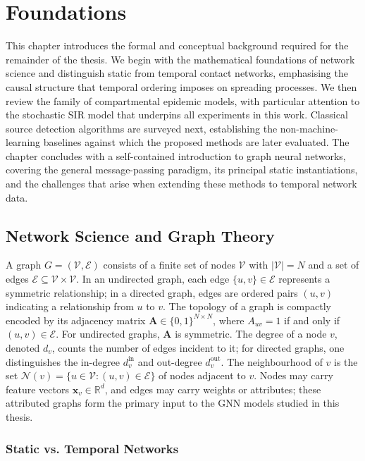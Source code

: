 \chapter{Foundations}
\label{c:chapter1}

This chapter introduces the formal and conceptual background required for the remainder of the thesis. We begin with the mathematical foundations of network science and distinguish static from temporal contact networks, emphasising the causal structure that temporal ordering imposes on spreading processes. We then review the family of compartmental epidemic models, with particular attention to the stochastic SIR model that underpins all experiments in this work. Classical source detection algorithms are surveyed next, establishing the non-machine-learning baselines against which the proposed methods are later evaluated. The chapter concludes with a self-contained introduction to graph neural networks, covering the general message-passing paradigm, its principal static instantiations, and the challenges that arise when extending these methods to temporal network data.

\section{Network Science and Graph Theory}
\label{st:section1}

A graph $G = (\mathcal{V}, \mathcal{E})$ consists of a finite set of nodes $\mathcal{V}$ with $|\mathcal{V}| = N$ and a set of edges $\mathcal{E} \subseteq \mathcal{V} \times \mathcal{V}$. In an undirected graph, each edge $\{u, v\} \in \mathcal{E}$ represents a symmetric relationship; in a directed graph, edges are ordered pairs $(u, v)$ indicating a relationship from $u$ to $v$. The topology of a graph is compactly encoded by its adjacency matrix $\mathbf{A} \in \{0,1\}^{N \times N}$, where $A_{uv} = 1$ if and only if $(u, v) \in \mathcal{E}$. For undirected graphs, $\mathbf{A}$ is symmetric. The degree of a node $v$, denoted $d_v$, counts the number of edges incident to it; for directed graphs, one distinguishes the in-degree $d_v^{\mathrm{in}}$ and out-degree $d_v^{\mathrm{out}}$. The neighbourhood of $v$ is the set $\mathcal{N}(v) = \{u \in \mathcal{V} : (u,v) \in \mathcal{E}\}$ of nodes adjacent to $v$. Nodes may carry feature vectors $\mathbf{x}_v \in \mathbb{R}^d$, and edges may carry weights or attributes; these attributed graphs form the primary input to the GNN models studied in this thesis.

\subsection{Static vs. Temporal Networks}

